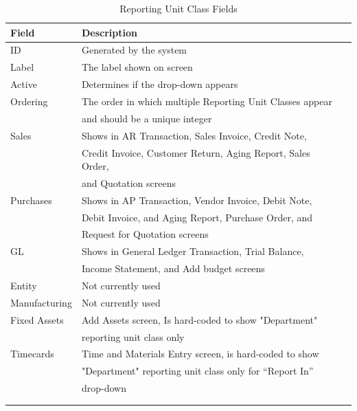 \begin{longtable}{ llp{6cm} }
	Field  & Description\\ \hline
	\endhead
	ID & Generated by the system\\
	Label & The label shown on screen\\
	Active & Determines if the drop-down appears\\
	Ordering & The order in which multiple Reporting Unit Classes appear\\
		 & and should be a unique integer\\
	Sales & Shows in AR Transaction, Sales Invoice, Credit Note,  \\
         & Credit Invoice, Customer Return, Aging Report, Sales Order,\\
         & and Quotation screens\\
	Purchases & Shows in AP Transaction, Vendor Invoice, Debit Note, \\
		 &  Debit Invoice, and Aging Report, Purchase Order, and\\
		 & Request for Quotation screens\\
	GL &  Shows in General Ledger Transaction, Trial Balance, \\
		 &  Income Statement, and Add budget screens\\
	Entity &  Not currently used\\
	Manufacturing & Not currently used \\
	Fixed Assets &  Add Assets screen, Is hard-coded to show "Department" \\
		 & reporting unit class only\\
	Timecards &  Time and Materials Entry screen, is hard-coded to show  \\
		 & "Department" reporting unit class only for ``Report In''\\
		 & drop-down \\
		 \\
	\caption{Reporting Unit Class Fields}
	\label{fig:subsec-company-config-reporting-class-fields}
\end{longtable}

